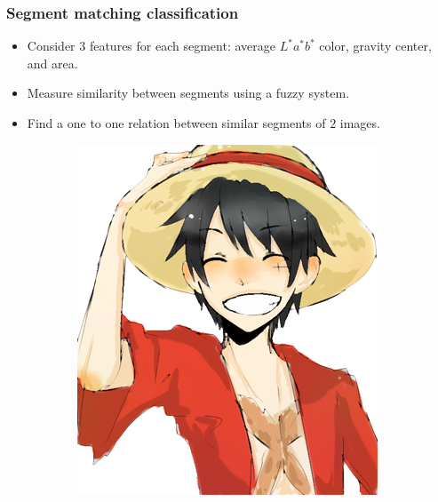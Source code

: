 \documentclass{beamer}
\begin{document}
\begin{frame}
\frametitle{Segment matching classification}
\begin{itemize}
\item Consider $3$ features for each segment: average $L^*a^*b^*$ color, gravity center, and area.
\item Measure similarity between segments using a fuzzy system.
\item Find a one to one relation between similar segments of $2$ images.
\end{itemize}

\begin{figure}
\centering
\begin{subfigure}{0.24\textwidth}
\includegraphics[width=\textwidth]{../images/rufy_d.png}
\end{subfigure}
\begin{subfigure}{0.24\textwidth}

\end{subfigure}
\end{figure}
\end{frame}
\end{document}

